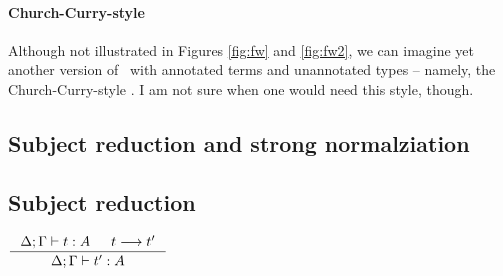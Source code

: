 \paragraph{Church-Curry-style \Fw}
Although not illustrated in Figures \ref{fig:fw} and \ref{fig:fw2},
we can imagine yet another version of \Fw\ with annotated terms
and unannotated types -- namely, the Church-Curry-style \Fw.
I am not sure when one would need this style, though.



\subsection{Subject reduction and strong normalziation}\label{sec:f:srsn}
\subsection*{Subject reduction}
\begin{theorem}
$\inference{\Delta;\Gamma |- t : A  & t --> t'}{\Delta;\Gamma |- t' : A}$
\end{theorem}


